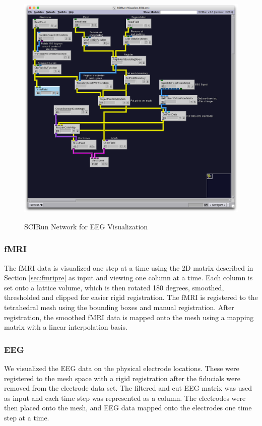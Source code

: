 \begin{figure}[p]
\begin{center}
\includegraphics[width=\textwidth]{Figures/EEG_network.png}\\
\caption{SCIRun Network for EEG Visualization}
\label{fig:eegvis}
\end{center}
\end{figure} 

\subsubsection{fMRI}

The fMRI data is visualized one step at a time using the 2D matrix described in Section \ref{sec:fmripre} as input and viewing one column at a time. Each column is set onto a lattice volume, which is then rotated 180 degrees, smoothed, thresholded and clipped for easier rigid registration. The fMRI is registered to the tetrahedral mesh using the bounding boxes and manual registration. After registration, the smoothed fMRI data is mapped onto the mesh using a mapping matrix with a linear interpolation basis. 

\subsubsection{EEG}

We visualized the EEG data on the physical electrode locations. These were registered to the mesh space with a rigid registration after the fiducials were removed from the electrode data set. The filtered and cut EEG matrix was used as input and each time step was represented as a column. The electrodes were then placed onto the mesh, and EEG data mapped onto the electrodes one time step at a time. 
